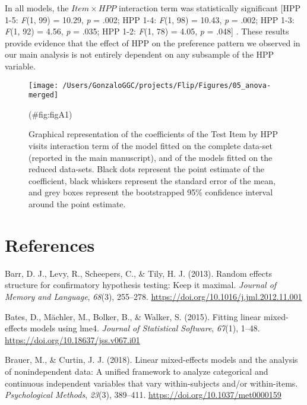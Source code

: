 \begin{appendix}
In all models, the \(Item \times HPP\) interaction term was
statistically significant {[}HPP 1-5: \emph{F}(1, 99) = 10.29, \emph{p}
= .002; HPP 1-4: \emph{F}(1, 98) = 10.43, \emph{p} = .002; HPP 1-3:
\emph{F}(1, 92) = 4.56, \emph{p} = .035; HPP 1-2: \emph{F}(1, 78) =
4.05, \emph{p} = .048{]} . These results provide evidence that the
effect of HPP on the preference pattern we observed in our main analysis
is not entirely dependent on any subsample of the HPP variable.

\begin{figure}
\texttt{[image: /Users/GonzaloGGC/projects/Flip/Figures/05\_anova-merged]} \caption{Graphical representation of the coefficients of the Test Item by HPP visits interaction term of the model fitted on the complete data-set (reported in the main manuscript), and of the models fitted on the reduced data-sets. Black dots represent the point estimate of the coefficient, black whiskers represent the standard error of the mean, and grey boxes represent the bootstrapped 95\% confidence interval around the point estimate.}(\#fig:figA1)
\end{figure}

\newpage

\hypertarget{references}{%
\section{References}\label{references}}

\begingroup
\setlength{\parindent}{-0.5in}
\setlength{\leftskip}{0.5in}

\hypertarget{refs}{}
\leavevmode\hypertarget{ref-barr2013}{}%
Barr, D. J., Levy, R., Scheepers, C., \& Tily, H. J. (2013). Random
effects structure for confirmatory hypothesis testing: Keep it maximal.
\emph{Journal of Memory and Language}, \emph{68}(3), 255--278.
\url{https://doi.org/10.1016/j.jml.2012.11.001}

\leavevmode\hypertarget{ref-bates2015}{}%
Bates, D., Mächler, M., Bolker, B., \& Walker, S. (2015). Fitting linear
mixed-effects models using lme4. \emph{Journal of Statistical Software},
\emph{67}(1), 1--48. \url{https://doi.org/10.18637/jss.v067.i01}

\leavevmode\hypertarget{ref-brauer2018}{}%
Brauer, M., \& Curtin, J. J. (2018). Linear mixed-effects models and the
analysis of nonindependent data: A unified framework to analyze
categorical and continuous independent variables that vary
within-subjects and/or within-items. \emph{Psychological Methods},
\emph{23}(3), 389--411. \url{https://doi.org/10.1037/met0000159}


\end{appendix}
